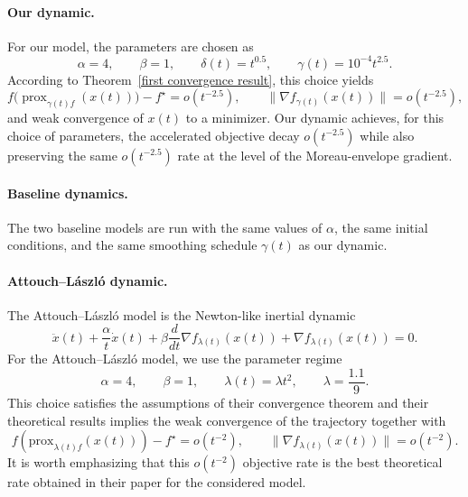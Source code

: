 \documentclass[11pt]{article}
\numberwithin{equation}{section}
\DeclareMathOperator{\prox}{prox}
\begin{document}
\paragraph{Our dynamic.}
For our model, the parameters are chosen as
\[
\alpha=4,
\qquad
\beta=1,
\qquad
\delta(t)=t^{0.5},
\qquad
\gamma(t)=10^{-4}t^{2.5}.
\]
According to Theorem~\ref{first convergence result}, this choice yields
\[
f\bigl(\prox_{\gamma(t)f}(x(t))\bigr)-f^\star=o(t^{-2.5}),
\qquad
\|\nabla f_{\gamma(t)}(x(t))\|=o(t^{-2.5}),
\]
and weak convergence of \(x(t)\) to a minimizer. Our dynamic achieves, for this choice of parameters, the accelerated objective decay \(o(t^{-2.5})\) while also preserving the same \(o(t^{-2.5})\) rate at the level of the Moreau-envelope gradient. 

\paragraph{Baseline dynamics.}
The two baseline models are run with the same values of $\alpha$, the same initial conditions, and the same smoothing schedule $\gamma(t)$ as our dynamic.

\paragraph{Attouch--L\'aszl\'o dynamic.}
The Attouch--L\'aszl\'o model is the Newton-like inertial dynamic
\begin{equation}
\label{eq:attouch-numexp}
\ddot x(t)+\frac{\alpha}{t}\dot x(t)
+\beta \frac{d}{dt}\nabla f_{\lambda(t)}(x(t))
+\nabla f_{\lambda(t)}(x(t))=0.
\end{equation}
For the Attouch--L\'aszl\'o model, we use the parameter regime
\[
\alpha=4,
\qquad
\beta=1,
\qquad
\lambda(t)=\lambda t^2,
\qquad
\lambda=\frac{1.1}{9}.
\]
This choice satisfies the assumptions of their convergence theorem and their theoretical results implies the weak convergence of the trajectory together with
\[
f(\text{prox}_{\lambda(t)f}(x(t)))-f^\star=o(t^{-2}),
\qquad
\|\nabla f_{\lambda(t)}(x(t))\|=o(t^{-2}).
\]
It is worth emphasizing that this \(o(t^{-2})\) objective rate is the best theoretical rate obtained in their paper for the considered model. 
\end{document}
